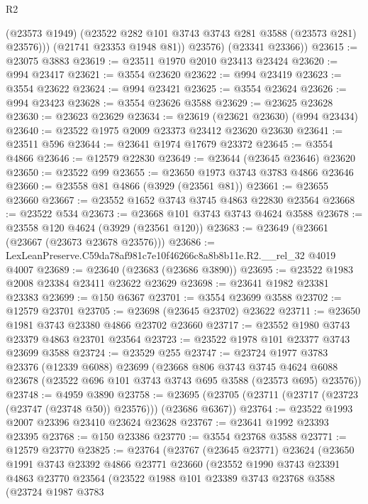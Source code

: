 \begin{lexlean}{R2}
\begin{coremodule}
              (@23573 @1949)
              (@23522 @282 @101 @3743 @3743 @281 @3588 (@23573 @281) @23576)))
          (@21741 @23353 @1948 @81))
        @23576)
      (@23341 @23366))
@23615 := @23075 @3883
@23619 := @23511 @1970 @2010 @23413 @23424
@23620 := @994 @23417
@23621 := @3554 @23620
@23622 := @994 @23419
@23623 := @3554 @23622
@23624 := @994 @23421
@23625 := @3554 @23624
@23626 := @994 @23423
@23628 := @3554 @23626 @3588
@23629 := @23625 @23628
@23630 := @23623 @23629
@23634 := @23619 (@23621 @23630) (@994 @23434)
@23640 := @23522 @1975 @2009 @23373 @23412 @23620 @23630
@23641 := @23511 @596
@23644 := @23641 @1974 @17679 @23372
@23645 := @3554 @4866
@23646 := @12579 @22830
@23649 := @23644 (@23645 @23646) @23620
@23650 := @23522 @99
@23655 := @23650 @1973 @3743 @3783 @4866 @23646
@23660 := @23558 @81 @4866 (@3929 (@23561 @81))
@23661 := @23655 @23660
@23667 := @23552 @1652 @3743 @3745 @4863 @22830 @23564
@23668 := @23522 @534
@23673 := @23668 @101 @3743 @3743 @4624 @3588
@23678 := @23558 @120 @4624 (@3929 (@23561 @120))
@23683 := @23649 (@23661 (@23667 (@23673 @23678 @23576)))
@23686 := LexLeanPreserve.C59da78af981c7e10f46266c8a8b8b11e.R2.__rel_32 @4019 @4007
@23689 := @23640 (@23683 (@23686 @3890))
@23695 := @23522 @1983 @2008 @23384 @23411 @23622 @23629
@23698 := @23641 @1982 @23381 @23383
@23699 := @150 @6367
@23701 := @3554 @23699 @3588
@23702 := @12579 @23701
@23705 := @23698 (@23645 @23702) @23622
@23711 := @23650 @1981 @3743 @23380 @4866 @23702 @23660
@23717 := @23552 @1980 @3743 @23379 @4863 @23701 @23564
@23723 := @23522 @1978 @101 @23377 @3743 @23699 @3588
@23724 := @23529 @255
@23747 := @23724
    @1977
    @3783
    @23376
    (@12339 @6088)
    @23699
    (@23668
      @806
      @3743
      @3745
      @4624
      @6088
      @23678
      (@23522 @696 @101 @3743 @3743 @695 @3588 (@23573 @695) @23576))
@23748 := @4959 @3890
@23758 := @23695 (@23705 (@23711 (@23717 (@23723 (@23747 (@23748 @50)) @23576))) (@23686 @6367))
@23764 := @23522 @1993 @2007 @23396 @23410 @23624 @23628
@23767 := @23641 @1992 @23393 @23395
@23768 := @150 @23386
@23770 := @3554 @23768 @3588
@23771 := @12579 @23770
@23825 := @23764
    (@23767
      (@23645 @23771)
      @23624
      (@23650
        @1991
        @3743
        @23392
        @4866
        @23771
        @23660
        (@23552
          @1990
          @3743
          @23391
          @4863
          @23770
          @23564
          (@23522
            @1988
            @101
            @23389
            @3743
            @23768
            @3588
            (@23724
              @1987
              @3783

\end{coremodule}
\end{lexlean}
